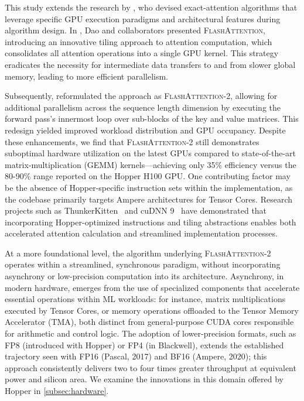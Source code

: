 This study extends the research by \citet{dao2022flashattention}, who devised exact-attention algorithms that leverage specific GPU execution paradigms and architectural features during algorithm design. In \citep{dao2022flashattention}, Dao and collaborators presented \textsc{FlashAttention}, introducing an innovative tiling approach to attention computation, which consolidates all attention operations into a single GPU kernel. This strategy eradicates the necessity for intermediate data transfers to and from slower global memory, leading to more efficient parallelism.

Subsequently, \citet{dao2023flashattention2} reformulated the approach as \textsc{FlashAttention-2}, allowing for additional parallelism across the sequence length dimension by executing the forward pass's innermost loop over sub-blocks of the key and value matrices. This redesign yielded improved workload distribution and GPU occupancy. Despite these enhancements, we find that \textsc{FlashAttention-2} still demonstrates suboptimal hardware utilization on the latest GPUs compared to state-of-the-art matrix-multiplication (GEMM) kernels—achieving only 35\% efficiency versus the 80-90\% range reported on the Hopper H100 GPU. One contributing factor may be the absence of Hopper-specific instruction sets within the implementation, as the codebase primarily targets Ampere architectures for Tensor Cores. Research projects such as ThunkerKitten~\citep{spector2024thunder} and cuDNN 9~\citep{cudnn9} have demonstrated that incorporating Hopper-optimized instructions and tiling abstractions enables both accelerated attention calculation and streamlined implementation processes.

At a more foundational level, the algorithm underlying \textsc{FlashAttention-2} operates within a streamlined, synchronous paradigm, without incorporating asynchrony or low-precision computation into its architecture. Asynchrony, in modern hardware, emerges from the use of specialized components that accelerate essential operations within ML workloads: for instance, matrix multiplications executed by Tensor Cores, or memory operations offloaded to the Tensor Memory Accelerator (TMA), both distinct from general-purpose CUDA cores responsible for arithmetic and control logic. The adoption of lower-precision formats, such as FP8 (introduced with Hopper) or FP4 (in Blackwell), extends the established trajectory seen with FP16 (Pascal, 2017) and BF16 (Ampere, 2020); this approach consistently delivers two to four times greater throughput at equivalent power and silicon area. We examine the innovations in this domain offered by Hopper in \cref{subsec:hardware}. 


